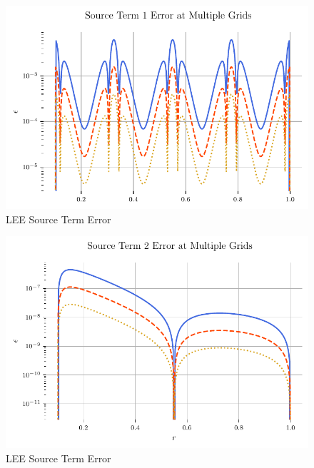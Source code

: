 \begin{figure}[h!]
    \centering
    \includegraphics{../../../CodeRun/04-plotReport/tex-outputs/MMS1_SourceTermError1.pdf}
    \caption{LEE Source Term Error}
    \label{fig:7}
\end{figure}


\begin{figure}[h!]
    \centering
    \includegraphics{../../../CodeRun/04-plotReport/tex-outputs/MMS1_SourceTermError2.pdf}
    \caption{LEE Source Term Error}
    \label{fig:7}
\end{figure}


